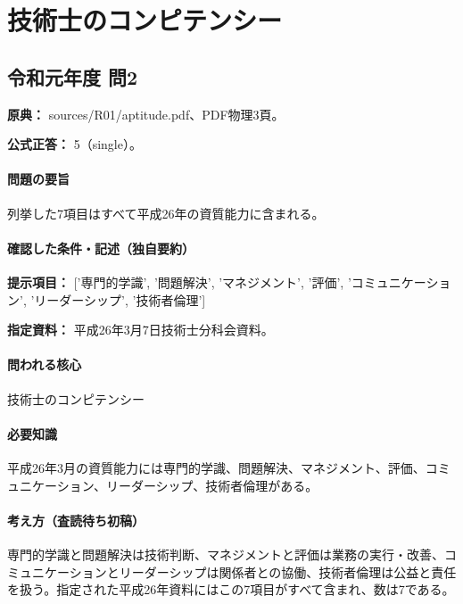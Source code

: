\section{技術士のコンピテンシー}

\subsection{令和元年度 問2}
\label{q:r01-reg-apt-02}

\noindent\textbf{原典：} sources/R01/aptitude.pdf、PDF物理3頁。

\textbf{公式正答：} 5（single）。

\paragraph{問題の要旨} 列挙した7項目はすべて平成26年の資質能力に含まれる。

\paragraph{確認した条件・記述（独自要約）}\mbox{}\par

\noindent\textbf{提示項目：} ['専門的学識', '問題解決', 'マネジメント', '評価', 'コミュニケーション', 'リーダーシップ', '技術者倫理']\par

\noindent\textbf{指定資料：} 平成26年3月7日技術士分科会資料。\par

\paragraph{問われる核心} 技術士のコンピテンシー

\paragraph{必要知識} 平成26年3月の資質能力には専門的学識、問題解決、マネジメント、評価、コミュニケーション、リーダーシップ、技術者倫理がある。

\paragraph{考え方（査読待ち初稿）} 専門的学識と問題解決は技術判断、マネジメントと評価は業務の実行・改善、コミュニケーションとリーダーシップは関係者との協働、技術者倫理は公益と責任を扱う。指定された平成26年資料にはこの7項目がすべて含まれ、数は7である。

